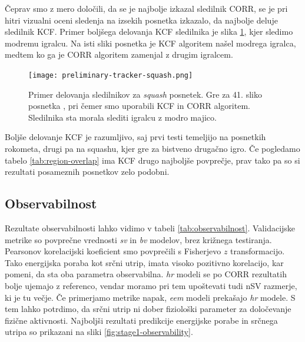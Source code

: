 Čeprav smo z mero določili, da se je najbolje izkazal sledilnik CORR, se je pri hitri vizualni oceni sledenja na izsekih posnetka \cite{squashtv2014squash} izkazalo, da najbolje deluje sledilnik KCF. Primer boljšega delovanja KCF sledilnika je slika \ref{fig:squash-tracker-visual}, kjer sledimo modremu igralcu. Na isti sliki posnetka je KCF algoritem našel modrega igralca, medtem ko ga je CORR algoritem zamenjal z drugim igralcem. 



\begin{figure}[!htbp]
	\centering
	\texttt{[image: preliminary-tracker-squash.png]}
	\caption[Primer delovanja sledilnikov za \textit{squash} posnetek]{Primer delovanja sledilnikov za \textit{squash} posnetek. Gre za 41. sliko posnetka \cite{squashtv2014squash}, pri čemer smo uporabili KCF in CORR algoritem. Sledilnika sta morala slediti igralcu z modro majico.}
	\label{fig:squash-tracker-visual}
\end{figure}


Boljše delovanje KCF je razumljivo, saj prvi testi temeljijo na posnetkih rokometa, drugi pa na squashu, kjer gre za bistveno drugačno igro. Če pogledamo tabelo \ref{tab:region-overlap} ima KCF drugo najboljše povprečje, prav tako pa so si rezultati posameznih posnetkov zelo podobni. 


















\subsection{Observabilnost}
Rezultate observabilnosti lahko vidimo v tabeli \ref{tab:observabilnost}. Validacijske metrike so povprečne vrednosti \textit{sv} in \textit{bv} modelov, brez križnega testiranja.  Pearsonov korelacijski koeficient smo povprečili s Fisherjevo $z$ transformacijo. Tako energijska poraba kot srčni utrip, imata visoko pozitivno korelacijo, kar pomeni, da sta oba parametra observabilna. \textit{hr} modeli se po CORR rezultatih bolje ujemajo z referenco, vendar moramo pri tem upoštevati tudi nSV razmerje, ki je tu večje. Če primerjamo metrike napak, \textit{eem} modeli prekašajo \textit{hr} modele. S tem lahko potrdimo, da srčni utrip ni dober fiziološki parameter za določevanje fizične aktivnosti. Najboljši rezultati predikcije energijske porabe in srčnega utripa so prikazani na sliki \ref{fig:stage1-observability}.

